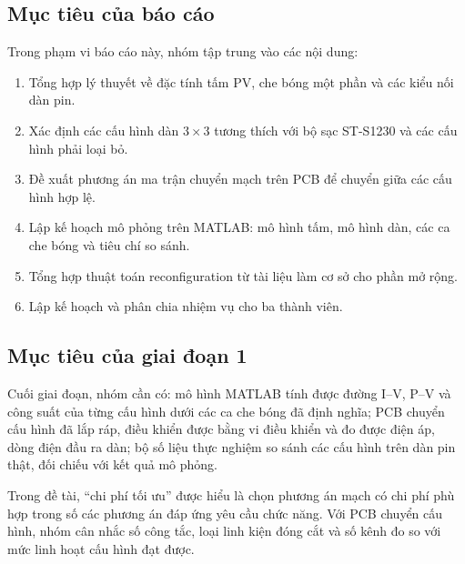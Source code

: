 \subsection{Mục tiêu của báo cáo}

Trong phạm vi báo cáo này, nhóm tập trung vào các nội dung:

\begin{enumerate}
    \item Tổng hợp lý thuyết về đặc tính tấm PV, che bóng một phần và các kiểu nối dàn pin.
    \item Xác định các cấu hình dàn \(3\times3\) tương thích với bộ sạc ST-S1230 và các cấu hình phải loại bỏ.
    \item Đề xuất phương án ma trận chuyển mạch trên PCB để chuyển giữa các cấu hình hợp lệ.
    \item Lập kế hoạch mô phỏng trên MATLAB: mô hình tấm, mô hình dàn, các ca che bóng và tiêu chí so sánh.
    \item Tổng hợp thuật toán reconfiguration từ tài liệu làm cơ sở cho phần mở rộng.
    \item Lập kế hoạch và phân chia nhiệm vụ cho ba thành viên.
\end{enumerate}

\subsection{Mục tiêu của giai đoạn 1}

Cuối giai đoạn, nhóm cần có: mô hình MATLAB tính được đường I--V, P--V và công suất của từng cấu hình dưới các ca che bóng đã định nghĩa; PCB chuyển cấu hình đã lắp ráp, điều khiển được bằng vi điều khiển và đo được điện áp, dòng điện đầu ra dàn; bộ số liệu thực nghiệm so sánh các cấu hình trên dàn pin thật, đối chiếu với kết quả mô phỏng.

Trong đề tài, ``chi phí tối ưu'' được hiểu là chọn phương án mạch có chi phí phù hợp trong số các phương án đáp ứng yêu cầu chức năng. Với PCB chuyển cấu hình, nhóm cân nhắc số công tắc, loại linh kiện đóng cắt và số kênh đo so với mức linh hoạt cấu hình đạt được.
